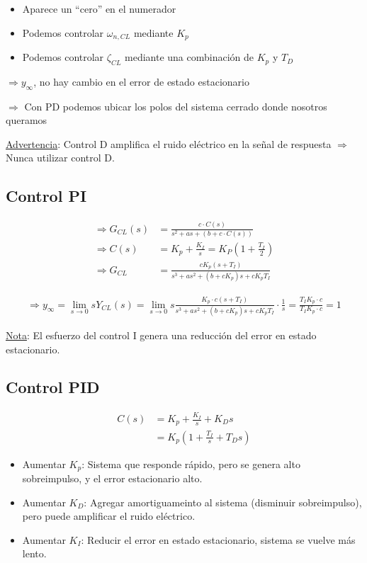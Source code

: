 \begin{itemize}
    \item Aparece un ``cero'' en el numerador
    \item Podemos controlar $\omega_{n,CL}$ mediante $K_p$
    \item Podemos controlar $\zeta_{CL}$ mediante una combinación de $K_p$ y $T_D$
\end{itemize}

$\Longrightarrow y_{\infty}$, no hay cambio en el error de estado estacionario\\
\par $\Longrightarrow$ Con PD podemos ubicar los polos del sistema cerrado donde nosotros queramos\\
\par \underline{Advertencia}: Control D amplifica el ruido eléctrico en la señal de respuesta $\Longrightarrow$ Nunca utilizar control D.

\subsection{Control PI}
\begin{align*}
    \Longrightarrow G_{CL}(s) &= \frac{c\cdot C(s)}{s^2+as+\left(b+c \cdot C(s)\right)}\\
    \Longrightarrow C(s) &= K_p +\frac{K_I}{s}=K_P\left(1+\frac{T_I}{2}\right)\\
    \Longrightarrow G_{CL} &= \frac{cK_p(s+T_I)}{s^3+as^2+(b+cK_p)s+cK_pT_I}
\end{align*}

\begin{align*}
    \Longrightarrow y_{\infty}=\lim_{s\to 0}sY_{CL}(s)=\lim_{s\to 0} s\frac{K_p\cdot c(s+T_I)}{s^3+as^2+(b+cK_p)s+cK_pT_I}\cdot\frac{1}{s}=\frac{T_IK_p\cdot c}{T_IK_p\cdot c}= 1
\end{align*}

\underline{Nota}: El esfuerzo del control I genera una reducción del error en estado estacionario.

\subsection{Control PID}
\begin{align*}
    C(s) &= K_p+\frac{K_I}{s}+K_Ds\\
    &= K_p\left(1+\frac{T_I}{s}+T_Ds\right)
\end{align*}

\begin{itemize}
    \item Aumentar $K_p$: Sistema que responde rápido, pero se genera alto sobreimpulso, y el error estacionario alto.
    \item Aumentar $K_D$: Agregar amortiguameinto al sistema (disminuir sobreimpulso), pero puede amplificar el ruido eléctrico.
    \item Aumentar $K_I$: Reducir el error en estado estacionario, sistema se vuelve más lento.
\end{itemize}

